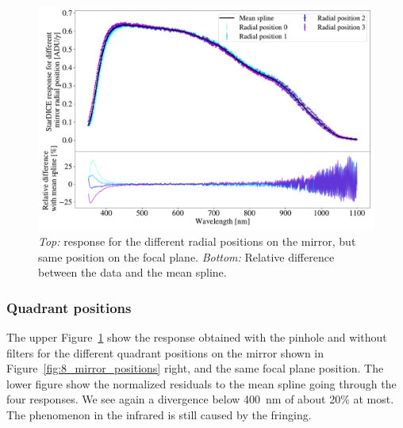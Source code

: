\begin{figure}[h]
    \centering
    \includegraphics[width=\columnwidth]{fig/radial_positions.pdf}
    \caption{\textit{Top:} \SD response for the different radial positions on the mirror, but same position on the focal plane. \textit{Bottom:} Relative difference between the data and the mean spline.}
    \label{fig:radial_positions}
\end{figure}

\subsubsection{Quadrant positions}

The upper Figure~\ref{fig:radial_positions} show the \SD response obtained with the \spinhole pinhole and without filters for the different quadrant positions on the mirror shown in Figure~\ref{fig:8_mirror_positions} right, and the same focal plane position. The lower figure show the normalized residuals to the mean spline going through the four responses. We see again a divergence below \SI{400}{\nm} of about 20\% at most. The phenomenon in the infrared is still caused by the fringing. 

